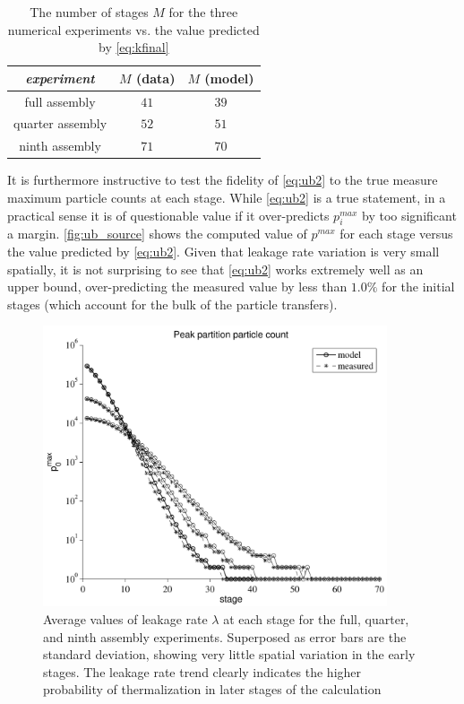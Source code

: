 \begin{table}
  \centering
  \begin{tabular}{c c c}
    \toprule
    \emph{experiment} & $M$ (data) & $M$ (model)  \\
    \midrule
    full assembly & $41$ & $39$  \\
    quarter assembly & $52$ & $51$ \\
    ninth assembly & $71$ & $70$  \\
    \bottomrule
  \end{tabular}
  \caption{The number of stages $M$ for the three numerical experiments vs. the
    value predicted by \eqref{eq:kfinal}}
  \label{tab:num_stages}
\end{table}
It is furthermore instructive to test the fidelity of \eqref{eq:ub2} to the true
measure maximum particle counts at each stage. While \eqref{eq:ub2} is a true
statement, in a practical sense it is of questionable value if it over-predicts
$p^{max}_i$ by too significant a margin. \autoref{fig:ub_source} shows the
computed value of $p^{max}$ for each stage versus the value predicted by
\eqref{eq:ub2}. Given that leakage rate variation is very small spatially, it is
not surprising to see that \eqref{eq:ub2} works extremely well as an upper
bound, over-predicting the measured value by less than $1.0\%$ for the initial
stages (which account for the bulk of the particle transfers).

\begin{figure}[ht!]
  \centering
  \includegraphics[width=4.0in]{figures/ch5/ub_source.pdf}
  \caption{Average values of leakage rate $\lambda$ at each stage for the full,
    quarter, and ninth assembly experiments. Superposed as error bars are the
    standard deviation, showing very little spatial variation in the early
    stages. The leakage rate trend clearly indicates the higher probability of
    thermalization in later stages of the calculation}
  \label{fig:ub_source}
\end{figure}

